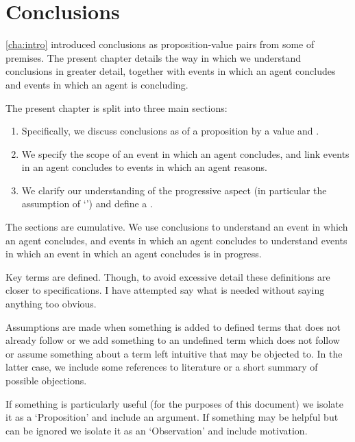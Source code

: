 \chapter{Conclusions}
\label{cha:clar}

\begin{note}
  \autoref{cha:intro} introduced conclusions as proposition-value pairs from some \pool{} of premises.
  The present chapter details the way in which we understand conclusions in greater detail, together with events in which an agent concludes and events in which an agent is concluding.

  The present chapter is split into three main sections:

  \begin{enumerate}[label=, leftmargin=0pt]
  \item

    Specifically, we discuss conclusions as \evalN{} of a proposition by a value and .
  \item

    We specify the scope of an event in which an agent concludes, and link events in an agent concludes to events in which an agent reasons.
  \item

    We clarify our understanding of the progressive aspect (in particular the assumption of `\assuPP{}') and define a \pevent{}.
  \end{enumerate}

  The sections are cumulative.
  We use conclusions to understand an event in which an agent concludes, and events in which an agent concludes to understand events in which an event in which an agent concludes is in progress.
\end{note}

\begin{note}
  Key terms are defined.
  Though, to avoid excessive detail these definitions are closer to specifications.
  I have attempted say what is needed without saying anything too obvious.

  Assumptions are made when something is added to defined terms that does not already follow or we add something to an undefined term which does not follow or assume something about a term left intuitive that may be objected to.
  In the latter case, we include some references to literature or a short summary of possible objections.

  If something is particularly useful (for the purposes of this document) we isolate it as a `Proposition' and include an argument.
  If something may be helpful but can be ignored we isolate it as an `Observation' and include motivation.
\end{note}

